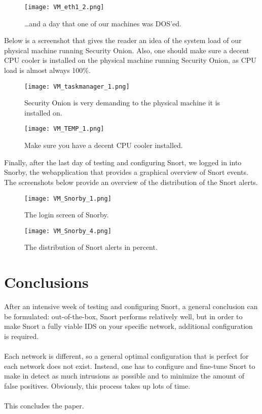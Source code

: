 \begin{figure}[h]
    \centering
    \texttt{[image: VM\_eth1\_2.png]}
    \caption{\ldots and a day that one of our machines was DOS'ed.}
\end{figure}
Below is a screenshot that gives the reader an idea of the system load of our physical machine running Security Onion. Also, one should make sure a decent CPU cooler is installed on the physical machine running Security Onion, as CPU load is almost always 100\%.
\begin{figure}[h]
    \centering
    \texttt{[image: VM\_taskmanager\_1.png]}
    \caption{Security Onion is very demanding to the physical machine it is installed on.}
\end{figure}

\begin{figure}[h]
    \centering
    \texttt{[image: VM\_TEMP\_1.png]}
    \caption{Make sure you have a decent CPU cooler installed.}
\end{figure}
\clearpage
Finally, after the last day of testing and configuring Snort, we logged in into Snorby, the webapplication that provides a graphical overview of Snort events. The screenshots below provide an overview of the distribution of the Snort alerts.
\begin{figure}[h]
    \centering
    \texttt{[image: VM\_Snorby\_1.png]}
    \caption{The login screen of Snorby.}
\end{figure}
 \begin{figure}[h]
    \centering
    \texttt{[image: VM\_Snorby\_4.png]}
    \caption{The distribution of Snort alerts in percent.}
\end{figure}

\clearpage

\section{Conclusions}

After an intensive week of testing and configuring Snort, a general conclusion can be formulated: out-of-the-box, Snort performs relatively well, but in order to make Snort a  fully viable IDS on your specific network, additional configuration is required. \\ \\
Each network is different, so a general optimal configuration that is perfect for each network does not exist. Instead, one has to configure and fine-tune Snort to make in detect as much intrusions as possible and to minimize the amount of false positives. Obviously, this process takes up lots of time. \\ \\
This concludes the paper. 

